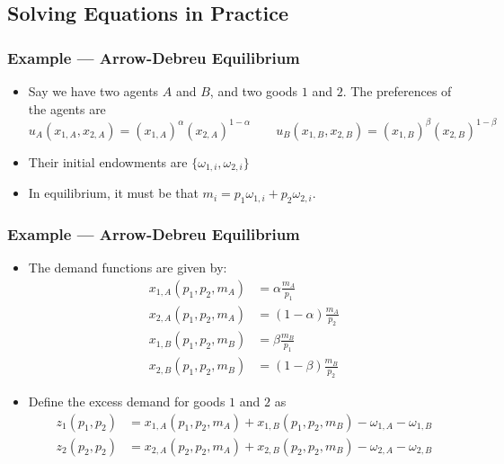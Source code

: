\documentclass[11pt,xcolor={svgnames},aspectratio=169,usepdftitle=false,notheorems]{beamer}
\begin{document}
\subsection{Solving Equations in Practice}

\begin{frame}[c]
  \frametitle{Example --- Arrow-Debreu Equilibrium}
  \begin{itemize}
    \item Say we have two agents $A$ and $B$, and two goods $1$ and $2$. The preferences of the agents are
      \[
        u_A(x_{1,A}, x_{2,A}) = \left( x_{1,A} \right)^{\alpha} \left( x_{2,A} \right)^{1 - \alpha} \qquad u_B(x_{1,B}, x_{2,B}) = \left( x_{1,B} \right)^{\beta} \left( x_{2,B} \right)^{1 - \beta}
      \]
    \item Their initial endowments are $\{\omega_{1,i}, \omega_{2,i}\}$
    \item In equilibrium, it must be that $m_i = p_1 \omega_{1,i} + p_2\omega_{2,i}$.
  \end{itemize}
\end{frame}

\begin{frame}[c]
  \frametitle{Example --- Arrow-Debreu Equilibrium}
 \begin{itemize}
  \item The demand functions are given by:
  \begin{align}
    x_{1,A}\left( p_1, p_2, m_A \right) & = \alpha\frac{m_A}{p_1} \label{eq:demand_1A} \\
    x_{2,A}\left( p_1, p_2, m_A \right) & = \left( 1 - \alpha \right)\frac{m_A}{p_2} \label{eq:demand_2A} \\ 
    x_{1,B}\left( p_1, p_2, m_B \right) & = \beta\frac{m_B}{p_1} \label{eq:demand_1B} \\
    x_{2,B}\left( p_1, p_2, m_B \right) & = \left( 1 - \beta \right)\frac{m_B}{p_2}  \label{eq:demand_2B}
  \end{align}
  \item Define the excess demand for goods $1$ and $2$ as 
    \begin{align}
      z_1(p_1, p_2) & = x_{1,A}\left( p_1, p_2, m_A \right) + x_{1,B}\left( p_1, p_2, m_B \right) - \omega_{1,A} - \omega_{1,B} \\
      z_2(p_2, p_2) & = x_{2,A}\left( p_2, p_2, m_A \right) + x_{2,B}\left( p_2, p_2, m_B \right) - \omega_{2,A} - \omega_{2,B}
    \end{align}
 \end{itemize} 
\end{frame}
\end{document}
